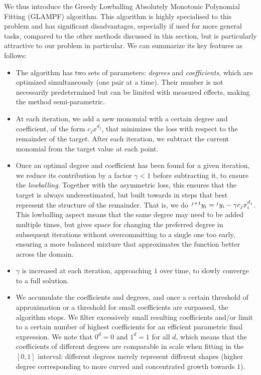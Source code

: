 \documentclass[12pt,a4paper]{article}
\begin{document}
We thus introduce the Greedy Lowballing Absolutely Monotonic Polynomial Fitting (GLAMPF) algorithm. This algorithm is highly specialised to this problem and has significant disadvantages, especially if used for more general tasks, compared to the other methods discussed in this section, but is particularly attractive to our problem in particular. We can summarize its key features as follows:

\begin{itemize}
\item The algorithm has two sets of parameters: {\emph{degrees}} and {\emph{coefficients}}, which are optimized simultaneously (one pair at a time). Their number is not necessarily predetermined but can be limited with measured effects, making the method semi-parametric.
\item At each iteration, we add a new monomial with a certain degree and coefficient, of the form $c_j x^{d_j}$, that minimizes the loss with respect to the remainder of the target. After each iteration, we subtract the current monomial from the target value at each point.
\item Once an optimal degree and coefficient has been found for a given iteration, we reduce its contribution by a factor $\gamma < 1$ before subtracting it, to ensure the {\emph{lowballing}}. Together with the asymmetric loss, this ensures that the target is always underestimated, but built towards in steps that best represent the structure of the remainder. That is, we do $\prescript{j+1}{}{y_i} = \prescript{j}{}{y_i} - \gamma c_j x_i^{d_j}$. This lowballing aspect means that the same degree may need to be added multiple times, but gives space for changing the preferred degree in subsequent iterations without overcommitting to a single one too early, ensuring a more balanced mixture that approximates the function better across the domain.
\item $\gamma$ is increased at each iteration, approaching $1$ over time, to slowly converge to a full solution.
\item We accumulate the coefficients and degrees, and once a certain threshold of approximation or a threshold for small coefficients are surpassed, the algorithm stops. We filter excessively small resulting coefficients and/or limit to a certain number of highest coefficients for an efficient parametric final expression. We note that $0^d = 0$ and $1^d = 1$ for all $d$, which means that the coefficients of different degrees are comparable in scale when fitting in the $[0,1]$ interval: different degrees merely represent different shapes (higher degree corresponding to more curved and concentrated growth towards $1$).
\end{itemize}
\end{document}
